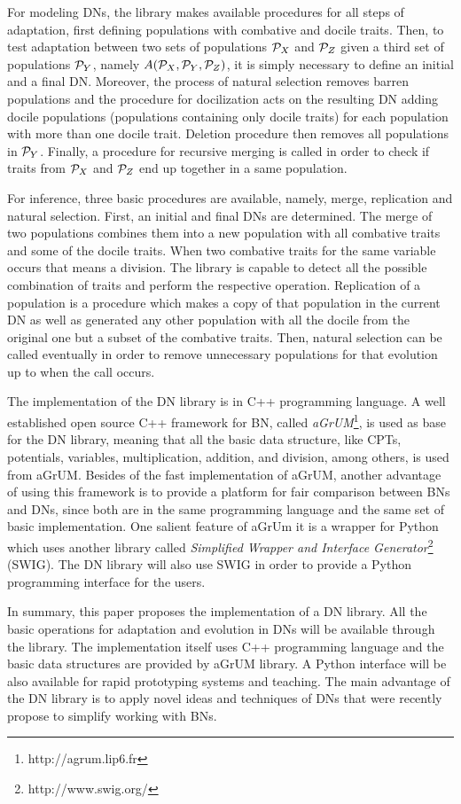 For modeling DNs, the library makes available procedures for all steps of adaptation, first defining populations with combative and docile traits.
Then, to test adaptation between two sets of populations ${\cal P}_X$ and ${\cal P}_Z$ given a third set of populations ${\cal P}_Y$, namely $A({\cal P}_X, {\cal P}_Y, {\cal P}_Z)$, it is simply necessary to define an initial and a final DN.
Moreover, the process of natural selection removes barren populations and the procedure for docilization acts on the resulting DN adding docile populations (populations containing only docile traits) for each population with more than one docile trait.
Deletion procedure then removes all populations in ${\cal P}_Y$.
Finally, a procedure for recursive merging is called in order to check if traits from ${\cal P}_X$ and ${\cal P}_Z$ end up together in a same population.

For inference, three basic procedures are available, namely, merge, replication and natural selection.
First, an initial and final DNs are determined.
The merge of two populations combines them into a new population with all combative traits and some of the docile traits.
When two combative traits for the same variable occurs that means a division.
The library is capable to detect all the possible combination of traits and perform the respective operation.
Replication of a population is a procedure which makes a copy of that population in the current DN as well as generated any other population with all the docile from the original one but a subset of the combative traits.
Then, natural selection can be called eventually in order to remove unnecessary populations for that evolution up to when the call occurs.

The implementation of the DN library is in C++ programming language.
A well established open source C++ framework for BN, called \emph{aGrUM}\footnote{http://agrum.lip6.fr}, is used as base for the DN library, meaning that all the basic data structure, like CPTs, potentials, variables, multiplication, addition, and division, among others, is used from aGrUM.
Besides of the fast implementation of aGrUM, another advantage of using this framework is to provide a platform for fair comparison between BNs and DNs, since both are in the same programming language and the same set of basic implementation.
One salient feature of aGrUm it is a wrapper for Python which uses another library called \emph{Simplified Wrapper and Interface Generator}\footnote{http://www.swig.org/} (SWIG).
The DN library will also use SWIG in order to provide a Python programming interface for the users.

In summary, this paper proposes the implementation of a DN library.
All the basic operations for adaptation and evolution in DNs will be available through the library.
The implementation itself uses C++ programming language and the basic data structures are provided by aGrUM library.
A Python interface will be also available for rapid prototyping systems and teaching.
The main advantage of the DN library is to apply novel ideas and techniques of DNs that were recently propose to simplify working with BNs.

